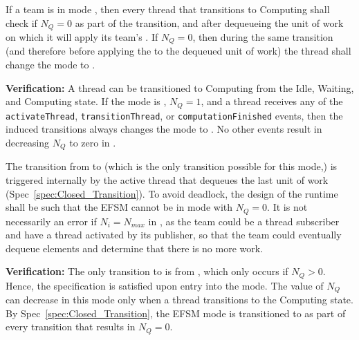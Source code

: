 \documentclass{article}
\begin{document}
\subsubsection{\TeamRunningClosed}
\begin{spec}
\label{spec:Closed_Transition}
If a team is in mode \TeamRunningClosed, then every thread that transitions to
Computing shall check if $N_Q = 0$ as part of the transition, and after
dequeueing the unit of work on which it will apply its team's \taskroutine.  If $N_Q =
0$, then during the same transition (and therefore before applying the \taskroutine to
the dequeued unit of work) the thread shall change the mode to
\TeamRunningNoMoreWork.
\end{spec}
\textbf{Verification:}\hspace{0.125in}  A thread can be transitioned to
Computing from the Idle, Waiting, and Computing state.  If the mode is
{\TeamRunningClosed}, $N_Q = 1$, and a
thread receives any of the \texttt{activateThread}, \texttt{transitionThread},
or \texttt{computationFinished} events, then the induced transitions always changes
the mode to \TeamRunningNoMoreWork.  No other events result in decreasing $N_Q$
to zero in \TeamRunningClosed.

\begin{spec}
\label{spec:Closed_NoWork}
The transition from {\TeamRunningClosed} to \TeamRunningNoMoreWork (which is the
only transition possible for this mode,) is triggered internally by the active
thread that dequeues the last unit of work (Spec~\ref{spec:Closed_Transition}).
To avoid deadlock, the design of the runtime shall be such that the
EFSM cannot be in mode {\TeamRunningClosed} with $N_Q = 0$.  It is not
necessarily an error if $N_i = N_{max}$ in {\TeamRunningClosed}, as the team
could be a thread subscriber and have a thread activated by its publisher, so
that the team could eventually dequeue elements and determine that there is no
more work.
\end{spec}
\textbf{Verification:}\hspace{0.125in}  The only transition to
{\TeamRunningClosed} is from {\TeamRunningOpen}, which only occurs if $N_Q > 0$.
Hence, the specification is satisfied upon entry into the mode.  The value of
$N_Q$ can decrease in this mode only when a thread transitions to the Computing
state.   By Spec~\ref{spec:Closed_Transition}, the EFSM mode is transitioned to
{\TeamRunningNoMoreWork} as part of every transition that results in $N_Q = 0$.
\end{document}
